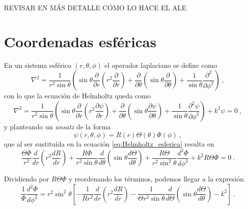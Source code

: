 REVISAR EN MÁS DETALLE CÓMO LO HACE EL ALE

\section{Coordenadas esféricas}

En un sistema esférico $(r, \theta,\phi)$ el operador laplaciano se define como
\begin{equation}
    \nabla^2 = \frac{1}{r^2 \sin\theta} \left( \sin\theta \frac{\partial}{\partial r}\left( r^2 \frac{\partial}{\partial r} \right) + \frac{\partial}{\partial \theta} \left( \sin\theta \frac{\partial}{\partial \theta} \right) + \frac{1}{\sin\theta} \frac{\partial^2}{\partial \phi^2} \right) \ ,
\end{equation}
con lo que la ecuación de Helmholtz queda como
\begin{equation} \label{eq:Helmholtz_esferica}
    \nabla^2 = \frac{1}{r^2 \sin\theta} \left( \sin\theta \frac{\partial}{\partial r}\left( r^2 \frac{\partial \psi}{\partial r} \right) + \frac{\partial}{\partial \theta} \left( \sin\theta \frac{\partial \psi}{\partial \theta} \right) + \frac{1}{\sin\theta} \frac{\partial^2 \psi}{\partial \phi^2} \right) + k^2\psi = 0 \ ,
\end{equation}
y planteando un \emph{ansatz} de la forma
\begin{equation}
    \psi(r,\theta, \phi) = R(r) \Theta(\theta) \Phi(\phi) \ ,
\end{equation}
que al ser sustituída en la ecuación \eqref{eq:Helmholtz_esferica} resulta en
\begin{equation}
    \frac{\Theta \Phi}{r^2} \frac{d}{dr}\left( r^2 \frac{dR}{dr} \right) + \frac{R\Phi}{r^2\sin\theta} \frac{d}{d \theta} \left( \sin\theta \frac{d\Theta}{d \theta} \right) + \frac{R\Theta}{r^2\sin^2\theta} \frac{d^2\Phi}{d \phi^2} + k^2 R \Theta \Phi = 0 \ .
\end{equation}

Dividiendo por $R\Theta\Phi$ y reordenando los términos, podemos llegar a la expresión
\begin{equation}
    \frac{1}{\Phi} \frac{d^2\Phi}{d\phi^2} = r^2\sin^2\theta \left[ -\frac{1}{Rr^2} \frac{d}{dr}\left( r^2 \frac{dR}{dr} \right) - \frac{1}{\Theta r^2\sin\theta} \frac{d}{d\Theta} \left( \sin\theta \frac{d\Theta}{d\theta} \right) - k^2 \right] \ .
\end{equation}

